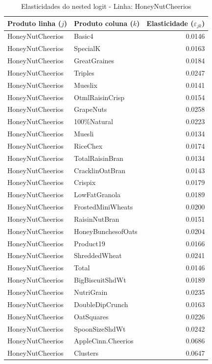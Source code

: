 \begingroup
\begin{table}[H]
\centering
\caption{Elasticidades do nested logit - Linha: HoneyNutCheerios}
\label{tab:elas-nested-honeynutcheerios}
\small
\begin{tabular}{llr}
\toprule
Produto linha ($j$) & Produto coluna ($k$) & Elasticidade ($\varepsilon_{jk}$) \\
\midrule
HoneyNutCheerios & Basic4 & 0.0146 \\
HoneyNutCheerios & SpecialK & 0.0163 \\
HoneyNutCheerios & GreatGraines & 0.0184 \\
HoneyNutCheerios & Triples & 0.0247 \\
HoneyNutCheerios & Mueslix & 0.0141 \\
HoneyNutCheerios & OtmlRaisinCrisp & 0.0154 \\
HoneyNutCheerios & GrapeNuts & 0.0258 \\
HoneyNutCheerios & 100\%Natural & 0.0223 \\
HoneyNutCheerios & Muesli & 0.0134 \\
HoneyNutCheerios & RiceChex & 0.0174 \\
HoneyNutCheerios & TotalRaisinBran & 0.0134 \\
HoneyNutCheerios & CracklinOatBran & 0.0143 \\
HoneyNutCheerios & Crispix & 0.0179 \\
HoneyNutCheerios & LowFatGranola & 0.0189 \\
HoneyNutCheerios & FrostedMiniWheats & 0.0200 \\
HoneyNutCheerios & RaisinNutBran & 0.0151 \\
HoneyNutCheerios & HoneyBunchesofOats & 0.0204 \\
HoneyNutCheerios & Product19 & 0.0166 \\
HoneyNutCheerios & ShreddedWheat & 0.0241 \\
HoneyNutCheerios & Total & 0.0146 \\
HoneyNutCheerios & BigBiscuitShdWt & 0.0189 \\
HoneyNutCheerios & NutriGrain & 0.0235 \\
HoneyNutCheerios & DoubleDipCrunch & 0.0163 \\
HoneyNutCheerios & OatSquares & 0.0226 \\
HoneyNutCheerios & SpoonSizeShdWt & 0.0242 \\
HoneyNutCheerios & AppleCinn.Cheerios & 0.0686 \\
HoneyNutCheerios & Clusters & 0.0647 \\

\end{tabular}
\end{table}

